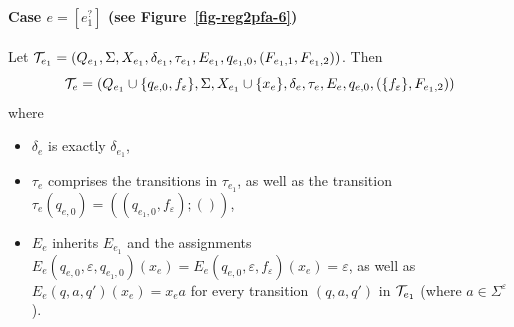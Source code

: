 \paragraph{Case $e = [e_1^?]$ (see Figure~\ref{fig-reg2pfa-6})} Let $\mathcal{T}_{e_1} = (Q_{e_1}, \Sigma, X_{e_1}, \delta_{e_1}, \tau_{e_1}, E_{e_1}, q_{e_1,0}, (F_{e_1,1}, F_{e_1,2}))$. Then 
\[\mathcal{T}_e = (Q_{e_1} \cup \{q_{e,0}, f_{\varepsilon}\}, \Sigma, X_{e_1} \cup \{x_e\}, 
		\delta_e, \tau_e, E_{e}, q_{e,0}, (\{f_{\varepsilon}\}, F_{e_1,2}))\]
where  
		\begin{itemize}
			\item $\delta_e$ is exactly $\delta_{e_1}$,
			\item $\tau_e$ comprises the transitions in $\tau_{e_1}$, as well as the transition $\tau_e(q_{e,0}) = ((q_{e_1,0}, f_{\varepsilon}); ())$,
			\item $E_e$ inherits $E_{e_1}$ and the assignments $E_e(q_{e,0},\varepsilon,q_{e_1, 0})(x_e) = E_e(q_{e,0},\varepsilon,f_{\varepsilon})(x_e) =\varepsilon$, as well as $E_e(q, a, q')(x_e) =x_e a$ for every transition $(q, a, q')$ in $\mathcal{T}_{e_1}$ (where $a \in \Sigma^\varepsilon$).
		\end{itemize}

